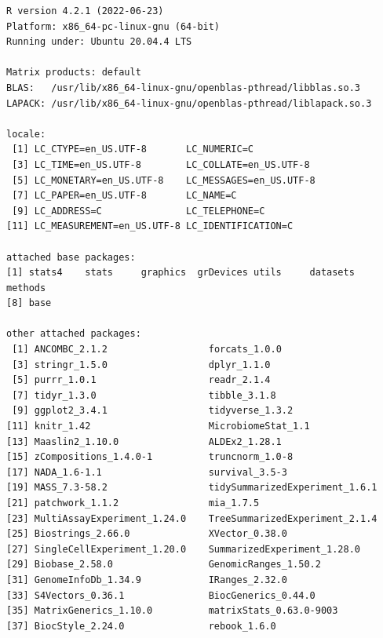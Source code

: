 \documentclass[
]{book}
\begin{document}
\begin{verbatim}
R version 4.2.1 (2022-06-23)
Platform: x86_64-pc-linux-gnu (64-bit)
Running under: Ubuntu 20.04.4 LTS

Matrix products: default
BLAS:   /usr/lib/x86_64-linux-gnu/openblas-pthread/libblas.so.3
LAPACK: /usr/lib/x86_64-linux-gnu/openblas-pthread/liblapack.so.3

locale:
 [1] LC_CTYPE=en_US.UTF-8       LC_NUMERIC=C              
 [3] LC_TIME=en_US.UTF-8        LC_COLLATE=en_US.UTF-8    
 [5] LC_MONETARY=en_US.UTF-8    LC_MESSAGES=en_US.UTF-8   
 [7] LC_PAPER=en_US.UTF-8       LC_NAME=C                 
 [9] LC_ADDRESS=C               LC_TELEPHONE=C            
[11] LC_MEASUREMENT=en_US.UTF-8 LC_IDENTIFICATION=C       

attached base packages:
[1] stats4    stats     graphics  grDevices utils     datasets  methods  
[8] base     

other attached packages:
 [1] ANCOMBC_2.1.2                  forcats_1.0.0                 
 [3] stringr_1.5.0                  dplyr_1.1.0                   
 [5] purrr_1.0.1                    readr_2.1.4                   
 [7] tidyr_1.3.0                    tibble_3.1.8                  
 [9] ggplot2_3.4.1                  tidyverse_1.3.2               
[11] knitr_1.42                     MicrobiomeStat_1.1            
[13] Maaslin2_1.10.0                ALDEx2_1.28.1                 
[15] zCompositions_1.4.0-1          truncnorm_1.0-8               
[17] NADA_1.6-1.1                   survival_3.5-3                
[19] MASS_7.3-58.2                  tidySummarizedExperiment_1.6.1
[21] patchwork_1.1.2                mia_1.7.5                     
[23] MultiAssayExperiment_1.24.0    TreeSummarizedExperiment_2.1.4
[25] Biostrings_2.66.0              XVector_0.38.0                
[27] SingleCellExperiment_1.20.0    SummarizedExperiment_1.28.0   
[29] Biobase_2.58.0                 GenomicRanges_1.50.2          
[31] GenomeInfoDb_1.34.9            IRanges_2.32.0                
[33] S4Vectors_0.36.1               BiocGenerics_0.44.0           
[35] MatrixGenerics_1.10.0          matrixStats_0.63.0-9003       
[37] BiocStyle_2.24.0               rebook_1.6.0                  


\end{verbatim}
\end{document}
